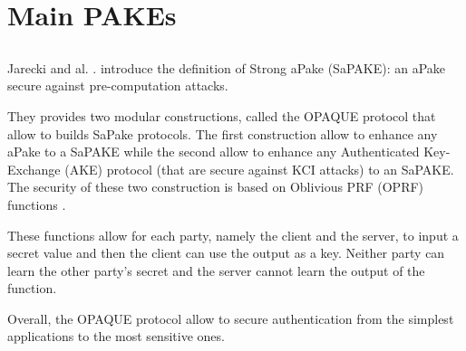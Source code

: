 \documentclass[../report.tex]{subfiles}
\begin{document}
\section{Main PAKEs}

\subsection{}


\paragraph{}
Jarecki and al. \cite{OPAQUE_Paper}. introduce the definition of Strong aPake (SaPAKE): an aPake secure against pre-computation attacks.

They provides two modular constructions, called the OPAQUE protocol that allow to builds SaPake protocols. The first construction allow to enhance any aPake to a SaPAKE while the second allow to enhance any Authenticated Key-Exchange (AKE) protocol (that are secure against KCI attacks) to an SaPAKE.
The security of these two construction is based on Oblivious PRF (OPRF) functions \cite{}.

These functions allow for each party, namely the client and the server, to input a secret value and then the client can use the output as a key. Neither party can learn the other party's secret and the server cannot learn the output of the function.

Overall, the OPAQUE protocol allow to secure authentication from the simplest applications to the most sensitive ones.
\end{document}
